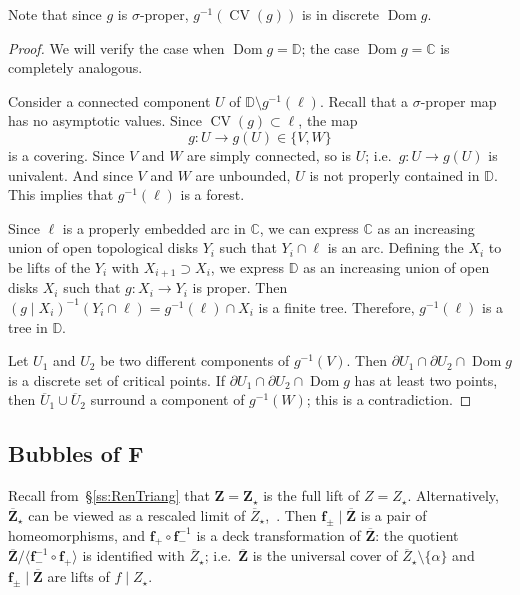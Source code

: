 \documentclass{amsart}
\newcommand{\Dom}{\operatorname {Dom}}
\newcommand{\1}{{\mathbb 1 }}
\newcommand{\bF}{{\mathbf F}}
\newcommand{\bZ}{{\mathbf Z}}
\newcommand{\bbf}{{\mathbf f}}
\newcommand{\str}{{\star}}
\newcommand{\C}{\mathbb{C}}
\newcommand{\Disk}{\mathbb{D}}
\theoremstyle{remark}
\numberwithin{equation}{section}
\theoremstyle{definition}
\newcommand{\CV}{{\operatorname{CV}}}
\theoremstyle{nonumberbreak}
\begin{document}
\noindent Note that since $g$ is $\sigma$-proper, $g^{-1}(\CV(g))$ is in discrete $\Dom g$.
\begin{proof}
We will verify the case when $\Dom g=\Disk$; the case $\Dom g=\C$ is completely analogous.


Consider a connected component $U$ of $\Disk\setminus g^{-1}(\ell)$. Recall that a $\sigma$-proper map has no asymptotic values. Since $\CV(g)\subset \ell$, the map \[g\colon U\to g(U)\in \{V,W\}\] is a covering. Since $V$ and $W$  are simply connected, so is $U$; i.e.~$g\colon U\to g(U)$ is univalent. And since $V$ and $W$  are unbounded, $U$ is not properly contained in $\Disk$. This implies that $g^{-1}(\ell)$ is a forest.

Since $\ell$ is a properly embedded arc in $\C$, we can express $\C$ as an increasing union of open topological disks $Y_i$ such that $Y_i\cap \ell $ is an arc. Defining the $X_i$ to be lifts of the $Y_i$ with $X_{i+1}\supset X_i$, we express $\Disk $ as an increasing union of open disks $X_i$ such that $g\colon X_i\to Y_i$ is proper. Then ${(g\mid X_i)^{-1}(Y_i\cap \ell )}=g^{-1}(\ell)\cap X_i$ is a finite tree. Therefore, $g^{-1}(\ell)$ is a tree in $\Disk$.




Let $U_1$ and $U_2$ be two different components of $g^{-1}(V)$. Then $\partial U_1\cap \partial U_2\cap \Dom g$ is a discrete set of critical points. If $\partial U_1\cap \partial U_2\cap \Dom g$ has at least two points, then $\overline U_1\cup \overline U_2$ surround a component of  $g^{-1}(W)$; this is a contradiction.
\end{proof}


\subsection{Bubbles of $\bF$}
\label{ss:FatComp of bFstr}
Recall from~\S\ref{ss:RenTriang} that $\bZ=\bZ_\str$ is the full lift of $Z=Z_\str$. Alternatively, $\overline \bZ_\str$ can be viewed as a rescaled limit of $\overline Z_\str$,~\cite{McM2}. Then $\bbf_\pm \mid \overline \bZ$ is a pair of homeomorphisms, and $ \bbf_+\circ \bbf_-^{-1}$ is a deck transformation of $\overline \bZ$: the quotient $\overline \bZ/\langle\bbf_-^{-1}\circ \bbf_+ \rangle$ is identified with $\overline Z_\str$; i.e.~$ \overline \bZ$ is the universal cover of $ \overline Z_\str\setminus \{\alpha\}$ and $\bbf_\pm\mid \overline\bZ$ are lifts of $f\mid Z_\str$.
\end{document}

